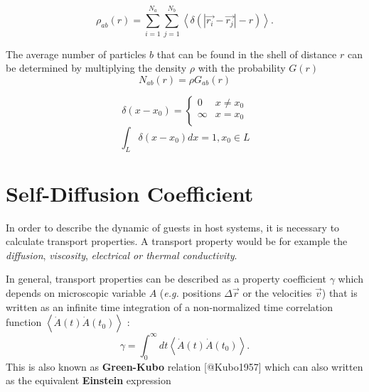 \documentclass[
  letterpaper,
]{article}
\begin{document}
\[
\rho_{ab}(r) =\sum_{i=1}^{N_a} \sum_{j=1}^{N_b} \left < \delta(|\vec{r_{i}}-\vec{r_{j}}| -r)\right >.
\]

The average number of particles \(b\) that can be found in the shell of
distance \(r\) can be determined by multiplying the density \(\rho\)
with the probability \(G(r)\) \[ 
N_{ab}(r) = \rho G_{ab}(r)
\]

\begin{tcolorbox}[enhanced jigsaw, toptitle=1mm, opacitybacktitle=0.6, colframe=quarto-callout-tip-color-frame, toprule=.15mm, breakable, bottomrule=.15mm, left=2mm, title=\textcolor{quarto-callout-tip-color}{\faLightbulb}\hspace{0.5em}{Dirac-Delta Function}, titlerule=0mm, leftrule=.75mm, bottomtitle=1mm, coltitle=black, arc=.35mm, rightrule=.15mm, opacityback=0, colback=white, colbacktitle=quarto-callout-tip-color!10!white]

\[
\delta(x-x_0) =  \begin{cases}
      0        & x \neq x_0\\
      \infty & x = x_0\\
    \end{cases}   
\] \[
\int_L \delta(x-x_0) dx = 1, x_0 \in L
\]

\end{tcolorbox}

\hypertarget{self-diffusion-coefficient}{%
\section*{Self-Diffusion Coefficient}\label{self-diffusion-coefficient}}


In order to describe the dynamic of guests in host systems, it is
necessary to calculate transport properties. A transport property would
be for example the \emph{diffusion}, \emph{viscosity}, \emph{electrical
or thermal conductivity}.

In general, transport properties can be described as a property
coefficient \(\gamma\) which depends on microscopic variable \(A\)
(\emph{e.g.} positions \(\Delta \vec{r}\) or the velocities \(\vec{v}\))
that is written as an infinite time integration of a non-normalized time
correlation function \(\left < \dot{A}(t)\dot{A}(t_0) \right >\) : \[
\gamma = \int_{0}^{\infty} dt \left < \dot{A}(t)\dot{A}(t_0) \right >.
\] This is also known as \textbf{Green-Kubo} relation {[}@Kubo1957{]}
which can also written as the equivalent \textbf{Einstein} expression
\end{document}
